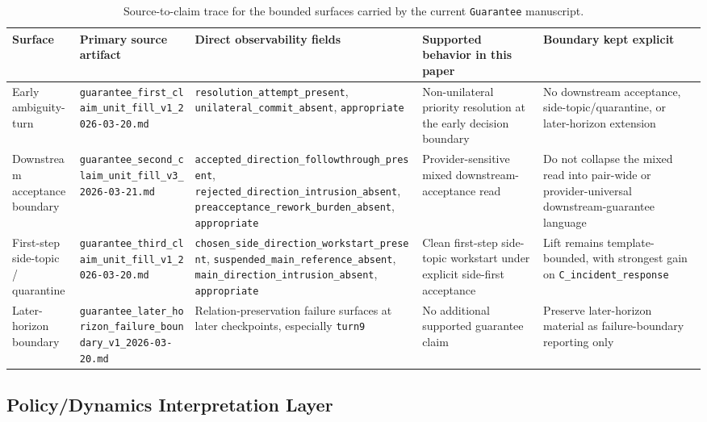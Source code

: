 \documentclass[11pt]{article}
\begin{document}
\begin{table}[ht]
\centering
\begin{tabular}{|p{}|p{}|p{}|p{}|p{}|}
\hline
\textbf{Surface} & \textbf{Primary source artifact} & \textbf{Direct observability fields} & \textbf{Supported behavior in this paper} & \textbf{Boundary kept explicit} \\
\hline
Early ambiguity-turn & \texttt{guarantee\_first\_claim\_unit\_fill\_v1\_2026-03-20.md} & \texttt{resolution\_attempt\_present}, \texttt{unilateral\_commit\_absent}, \texttt{appropriate} & Non-unilateral priority resolution at the early decision boundary & No downstream acceptance, side-topic/quarantine, or later-horizon extension \\
\hline
Downstream acceptance boundary & \texttt{guarantee\_second\_claim\_unit\_fill\_v3\_2026-03-21.md} & \texttt{accepted\_direction\_followthrough\_present}, \texttt{rejected\_direction\_intrusion\_absent}, \texttt{preacceptance\_rework\_burden\_absent}, \texttt{appropriate} & Provider-sensitive mixed downstream-acceptance read & Do not collapse the mixed read into pair-wide or provider-universal downstream-guarantee language \\
\hline
First-step side-topic / quarantine & \texttt{guarantee\_third\_claim\_unit\_fill\_v1\_2026-03-20.md} & \texttt{chosen\_side\_direction\_workstart\_present}, \texttt{suspended\_main\_reference\_absent}, \texttt{main\_direction\_intrusion\_absent}, \texttt{appropriate} & Clean first-step side-topic workstart under explicit side-first acceptance & Lift remains template-bounded, with strongest gain on \texttt{C\_incident\_response} \\
\hline
Later-horizon boundary & \texttt{guarantee\_later\_horizon\_failure\_boundary\_v1\_2026-03-20.md} & Relation-preservation failure surfaces at later checkpoints, especially \texttt{turn9} & No additional supported guarantee claim & Preserve later-horizon material as failure-boundary reporting only \\
\hline
\end{tabular}
\caption{Source-to-claim trace for the bounded surfaces carried by the current
\texttt{Guarantee} manuscript.}
\end{table}

\subsection{Policy/Dynamics Interpretation Layer}
\end{document}
